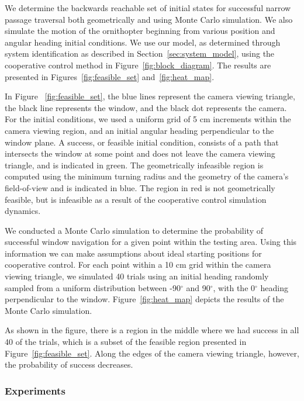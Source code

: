 \documentclass{aamas2013}
\begin{document}
We determine the backwards reachable set of initial states for successful
narrow passage traversal both geometrically and using Monte Carlo simulation.
We also simulate the motion of the ornithopter beginning from various position
and angular heading initial conditions. We use our model, as determined
through system identification as described in Section~\ref{sec:system_model},
using the cooperative control method in Figure~\ref{fig:block_diagram}. The
results are presented in Figures~\ref{fig:feasible_set}
and~\ref{fig:heat_map}.

In Figure ~\ref{fig:feasible_set}, 
the blue lines represent the camera viewing triangle, the black line represents the window, and the black 
dot represents the camera. For the initial conditions, we used a uniform
grid of 5 cm increments within the camera viewing region, and an initial
angular heading perpendicular to the window plane. A success, or feasible 
initial condition, consists of a path that intersects the window at some 
point and does not leave the camera viewing triangle, and is indicated in 
green. The geometrically infeasible region is computed using the minimum 
turning radius and the geometry of the camera's field-of-view and is 
indicated in blue. The region in red is not geometrically feasible, but is 
infeasible as a result of the cooperative control simulation dynamics.

We conducted a Monte Carlo simulation to determine the probability of
successful window navigation for a given point within the testing area. Using
this information we can make assumptions about ideal starting positions for
cooperative control. For each point within a 10 cm grid within the camera
viewing triangle, we simulated 40 trials using an initial heading randomly
sampled from a uniform distribution between -90$^{\circ}$ and 90$^{\circ}$,
with the 0$^{\circ}$ heading perpendicular to the window.
Figure~\ref{fig:heat_map} depicts the results of the Monte Carlo simulation.

As shown in the figure, there is a region in the middle where we had success
in all 40 of the trials, which is a subset of the feasible region presented in
Figure~\ref{fig:feasible_set}. Along the edges of the camera viewing triangle,
however, the probability of success decreases.

\subsubsection{Experiments}
\label{sec:experiments_verification}
\end{document}
